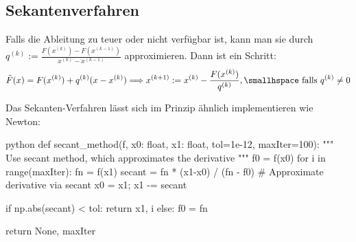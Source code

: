 \newsectionNoPB
\subsection{Sekantenverfahren}
Falls die Ableitung zu teuer oder nicht verfügbar ist, kann man sie durch $q^{(k)} := \frac{F(x^{(k)}) - F(x^{(k - 1)})}{x^{(k)} - x^{(k - 1)}}$ approximieren.
Dann ist ein Schritt:
\rmvspace
\begin{align*}
    \tilde{F}(x) = F(x^{(k)}) + q^{(k)} (x - x^{(k)}) \Longrightarrow x^{(k + 1)} := x^{(k)} - \frac{F(x^{(k)})}{q^{(k)}}, \smallhspace \text{ falls } q^{(k)} \neq 0
\end{align*}

\innumpy Das Sekanten-Verfahren lässt sich im Prinzip ähnlich implementieren wie Newton:

\begin{code}{python}
def secant_method(f, x0: float, x1: float, tol=1e-12, maxIter=100):
    """ Use secant method, which approximates the derivative """
    f0 = f(x0)
    for i in range(maxIter):
        fn = f(x1)
        secant = fn * (x1-x0) / (fn - f0)   # Approximate derivative via secant
        x0 = x1; x1 -= secant
        
        if np.abs(secant) < tol: return x1, i
        else: f0 = fn
        
    return None, maxIter
\end{code}
